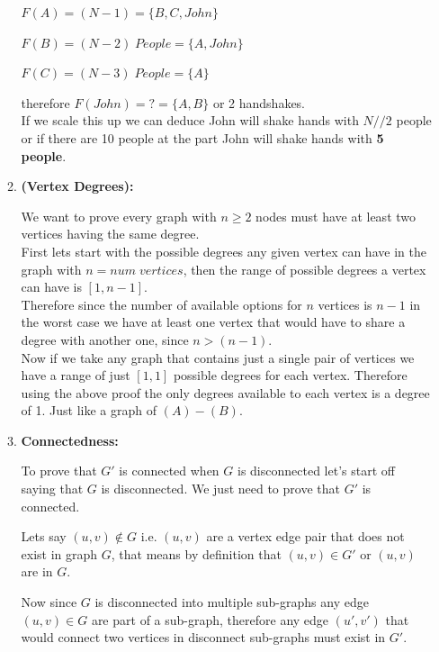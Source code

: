 \documentclass{article}
\begin{document}
\begin{enumerate}
\begin{enumerate}
        $F(A) = (N - 1) = \{B, C, John\}$
        
        $F(B) = (N - 2)\;People = \{A, John\}$
        
        $F(C) = (N - 3)\;People = \{A\}$ 
        
        therefore $F(John) = ? = \{A, B\}$ or 2 handshakes. \\

        If we scale this up we can deduce John will shake hands with $N//2$ people or if there are 10 people at the part John will shake hands with \textbf{5 people}.
        \item \textbf{(Vertex Degrees):}
        
        We want to prove every graph with $n \geq 2$ nodes must have at least two vertices having the same degree. \\
                
        First lets start with the possible degrees any given vertex can have in the graph with $n = num\;vertices$, then the range of possible degrees a vertex can have is $[1, n - 1]$. \\
        
        Therefore since the number of available options for $n$ vertices is $n - 1$ in the worst case we have at least one vertex that would have to share a degree with another one, since $n > (n - 1)$. \\
    
        Now if we take any graph that contains just a single pair of vertices we have a range of just $[1,1]$ possible degrees for each vertex. Therefore using the above proof the only degrees available to each vertex is a degree of 1. Just like a graph of $(A)-(B)$.

        \item \textbf{Connectedness:}
        
        To prove that $G'$ is connected when $G$ is disconnected let's start off saying that $G$ is disconnected. We just need to prove that $G'$ is connected.

        Lets say $(u, v) \notin G$ i.e. $(u, v)$ are a vertex edge pair that does not exist in graph $G$, that means by definition that $(u, v) \in G'$ or $(u, v)$ are in $G$.
       
        Now since $G$ is disconnected into multiple sub-graphs any edge $(u, v) \in G$ are part of a sub-graph, therefore any edge $(u', v')$ that would connect two vertices in disconnect sub-graphs must exist in $G'$.
       

\end{enumerate}
\end{enumerate}
\end{document}
